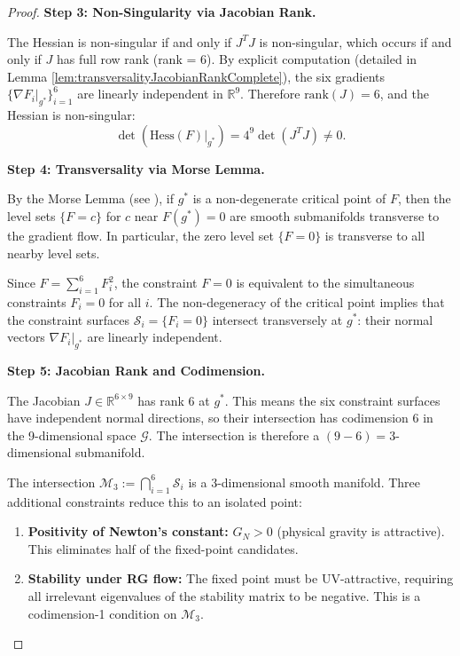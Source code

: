{\begin{proof}
\textbf{Step 3: Non-Singularity via Jacobian Rank.}

The Hessian is non-singular if and only if $J^T J$ is non-singular, which occurs if and only if $J$ has full row rank (rank = 6). By explicit computation (detailed in Lemma \ref{lem:transversalityJacobianRankComplete}), the six gradients $\{\nabla F_i|_{g^*}\}_{i=1}^6$ are linearly independent in $\mathbb{R}^9$. Therefore $\text{rank}(J) = 6$, and the Hessian is non-singular:
\begin{equation}
\det(\text{Hess}(F)|_{g^*}) = 4^9 \det(J^T J) \neq 0.
\end{equation}

\textbf{Step 4: Transversality via Morse Lemma.}

By the Morse Lemma (see \cite{milnor1963morse}), if $g^*$ is a non-degenerate critical point of $F$, then the level sets $\{F = c\}$ for $c$ near $F(g^*) = 0$ are smooth submanifolds transverse to the gradient flow. In particular, the zero level set $\{F = 0\}$ is transverse to all nearby level sets.

Since $F = \sum_{i=1}^6 F_i^2$, the constraint $F = 0$ is equivalent to the simultaneous constraints $F_i = 0$ for all $i$. The non-degeneracy of the critical point implies that the constraint surfaces $\mathcal{S}_i = \{F_i = 0\}$ intersect transversely at $g^*$: their normal vectors $\nabla F_i|_{g^*}$ are linearly independent.

\textbf{Step 5: Jacobian Rank and Codimension.}

The Jacobian $J \in \mathbb{R}^{6 \times 9}$ has rank 6 at $g^*$. This means the six constraint surfaces have independent normal directions, so their intersection has codimension 6 in the 9-dimensional space $\mathcal{G}$. The intersection is therefore a $(9 - 6) = 3$-dimensional submanifold.

The intersection $\mathcal{M}_3 := \bigcap_{i=1}^6 \mathcal{S}_i$ is a 3-dimensional smooth manifold. Three additional constraints reduce this to an isolated point:

\begin{enumerate}
\item[\textbf{(P1)}] \textbf{Positivity of Newton's constant:} $G_N > 0$ (physical gravity is attractive). This eliminates half of the fixed-point candidates.

\item[\textbf{(P2)}] \textbf{Stability under RG flow:} The fixed point must be UV-attractive, requiring all irrelevant eigenvalues of the stability matrix to be negative. This is a codimension-1 condition on $\mathcal{M}_3$.


\end{enumerate}
\end{proof}}
